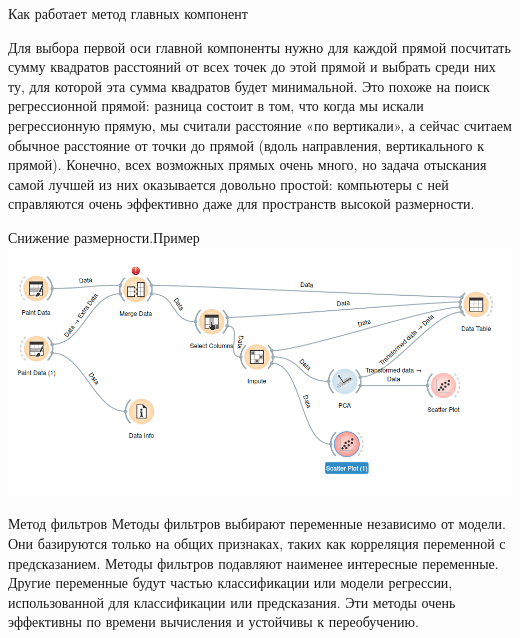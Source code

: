 \documentclass{beamer}
\begin{document}
 
 \begin{frame}{Как работает метод главных компонент}
 


Для выбора первой оси  главной компоненты  нужно для каждой прямой посчитать сумму квадратов расстояний от всех точек до этой прямой и выбрать среди них ту, для которой эта сумма квадратов будет минимальной. Это похоже на поиск регрессионной прямой: разница состоит в том, что когда мы искали регрессионную прямую, мы считали расстояние «по вертикали», а сейчас считаем обычное расстояние от точки до прямой (вдоль направления, вертикального к прямой). Конечно, всех возможных прямых очень много, но задача отыскания самой лучшей из них оказывается довольно простой: компьютеры с ней справляются очень эффективно даже для пространств высокой размерности. 
 \end{frame}

\begin{frame}{Снижение размерности.Пример}
  \includegraphics[scale=0.3]{task06_01.png}
\end{frame} 
 
 
 \begin{frame}{Метод фильтров}
    Методы фильтров выбирают переменные независимо от модели. Они базируются только на общих признаках, 
    таких как корреляция переменной с предсказанием. Методы фильтров подавляют наименее интересные переменные. 
    Другие переменные будут частью классификации или модели регрессии, использованной для классификации или предсказания.
 Эти методы очень эффективны по времени вычисления и устойчивы к переобучению. 
 \end{frame} 
 
\end{document}
